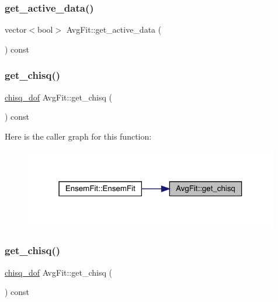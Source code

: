 \subsubsection{\texorpdfstring{get\_active\_data()}{get\_active\_data()}\hspace{0.1cm}{\footnotesize\ttfamily [2/2]}}
{\footnotesize\ttfamily vector$<$bool$>$ Avg\+Fit\+::get\+\_\+active\+\_\+data (\begin{DoxyParamCaption}{ }\end{DoxyParamCaption}) const\hspace{0.3cm}{\ttfamily [inline]}}

\mbox{\label{classAvgFit_ad4b8b6e5bf145cbeb62b02787612f226}} 
\subsubsection{\texorpdfstring{get\_chisq()}{get\_chisq()}\hspace{0.1cm}{\footnotesize\ttfamily [1/2]}}
{\footnotesize\ttfamily \mbox{\hyperlink{structchisq__dof}{chisq\+\_\+dof}} Avg\+Fit\+::get\+\_\+chisq (\begin{DoxyParamCaption}{ }\end{DoxyParamCaption}) const\hspace{0.3cm}{\ttfamily [inline]}}

Here is the caller graph for this function\+:
\nopagebreak
\begin{figure}[H]
\begin{center}
\leavevmode
\includegraphics[width=315pt]{d4/dfd/classAvgFit_ad4b8b6e5bf145cbeb62b02787612f226_icgraph}
\end{center}
\end{figure}
\mbox{\label{classAvgFit_ad4b8b6e5bf145cbeb62b02787612f226}} 
\subsubsection{\texorpdfstring{get\_chisq()}{get\_chisq()}\hspace{0.1cm}{\footnotesize\ttfamily [2/2]}}
{\footnotesize\ttfamily \mbox{\hyperlink{structchisq__dof}{chisq\+\_\+dof}} Avg\+Fit\+::get\+\_\+chisq (\begin{DoxyParamCaption}{ }\end{DoxyParamCaption}) const\hspace{0.3cm}{\ttfamily [inline]}}

